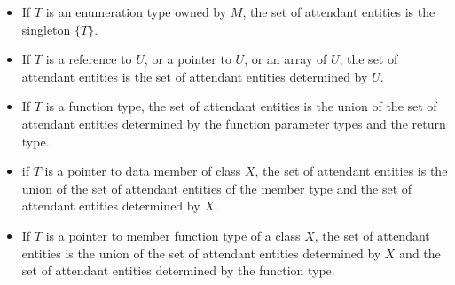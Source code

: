 \begin{std.txt}
\begin{before}
\begin{itemize}
    \item\color{addclr} If $T$ is an enumeration type owned by $M$, 
    the set of attendant entities is the singleton $\{T\}$.

    \item\color{addclr} If $T$ is a reference to $U$, or a pointer to $U$, or an array of $U$, 
    the set of attendant entities is the set of attendant entities determined by $U$.

    \item\color{addclr} If $T$ is a function type, the set of attendant entities is the
    union of the set of attendant entities determined by the function
    parameter types and the return type.

    \item\color{addclr} if $T$ is a pointer to data member of class $X$, the set of attendant
    entities is the union of the set of attendant entities of the member type
    and the set of attendant entities determined by $X$.
    
    \item\color{addclr} If $T$ is a pointer to member function type of a class $X$, the
    set of attendant entities is the union of the set of attendant entities
     determined by $X$ and the set of attendant entities determined by
    the function type.
    

\end{itemize}
\end{before}
\end{std.txt}
